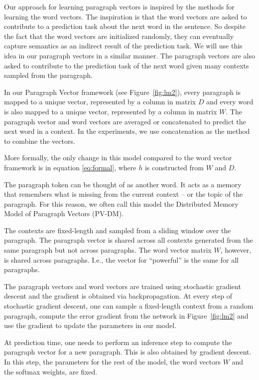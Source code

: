 \documentclass{article}
\begin{document}
Our approach for learning paragraph vectors is inspired by the methods
for learning the word vectors. The inspiration is that the word
vectors are asked to contribute to a prediction task about the next
word in the sentence. So despite the fact that the word vectors are
initialized randomly, they can eventually capture semantics as an
indirect result of the prediction task. We will use this idea in our
paragraph vectors in a similar manner. The paragraph vectors are also
asked to contribute to the prediction task of the next word given many
contexts sampled from the paragraph.

In our Paragraph Vector framework (see Figure~\ref{fig:lm2}), every
paragraph is mapped to a unique vector, represented by a column in
matrix $D$ and every word is also mapped to a unique vector,
represented by a column in matrix $W$. The paragraph vector and word
vectors are averaged or concatenated to predict the next word in a
context. In the experiments, we use concatenation as the method to
combine the vectors. 

More formally, the only change in this model compared to the word
vector framework is in equation \ref{eq:formal}, where $h$ is
constructed from $W$ and $D$.

The paragraph token can be thought of as another word. It acts as a
memory that remembers what is missing from the current context -- or
the topic of the paragraph. For this reason, we often call this model
the Distributed Memory Model of Paragraph Vectors (PV-DM). 

The contexts are fixed-length and sampled from a sliding window over
the paragraph. The paragraph vector is shared across all contexts
generated from the same paragraph but not across paragraphs. The word
vector matrix $W$, however, is shared across paragraphs. I.e., the
vector for ``powerful'' is the same for all paragraphs.

The paragraph vectors and word vectors are trained using stochastic
gradient descent and the gradient is obtained via backpropagation. At
every step of stochastic gradient descent, one can sample a
fixed-length context from a random paragraph, compute the error
gradient from the network in Figure~\ref{fig:lm2} and use the gradient
to update the parameters in our model.


At prediction time, one needs to perform an inference step to compute
the paragraph vector for a new paragraph. This is also obtained by
gradient descent. In this step, the parameters for the rest of the
model, the word vectors $W$ and the softmax weights, are fixed.
\end{document}
